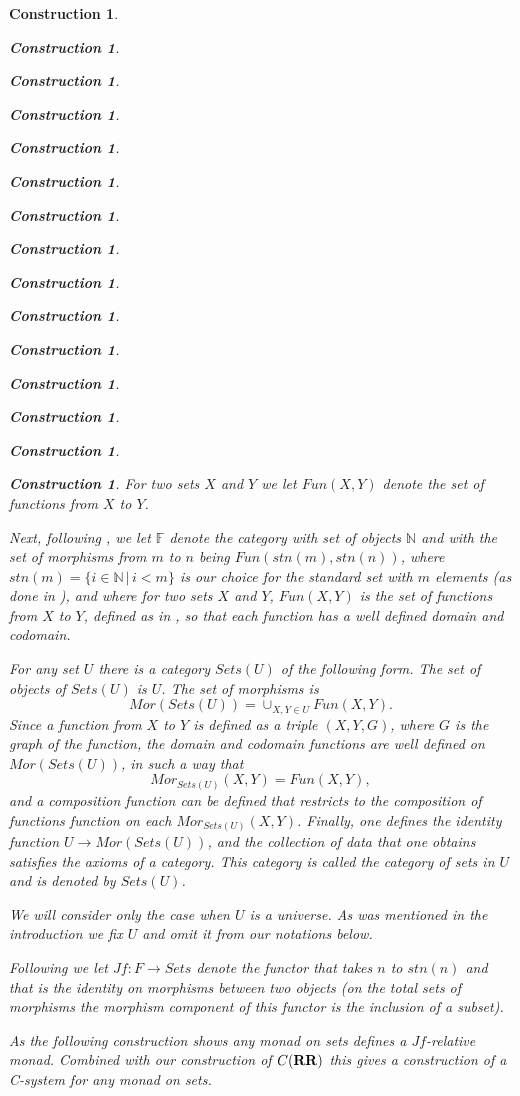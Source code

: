 \documentclass[12pt]{amsart}
\numberwithin{proposition}{subsection}
\newtheorem{construction}[proposition]{Construction}
\newcommand{\sr}{\rightarrow}
\newcommand{\nn}{{\mathbb N}}
\newcommand{\nat}{\nn}
\newcommand{\RR}{{\bf RR}}
\newcommand{\FF}{{\mathbb F}}
\begin{document}
\begin{construction}
\begin{construction}
\begin{construction}
\begin{construction}
\begin{construction}
\begin{construction}
\begin{construction}
\begin{construction}
\begin{construction}
\begin{construction}
\begin{construction}
\begin{construction}
\begin{construction}
\begin{construction}
\begin{construction}
For two sets $X$ and $Y$ we let $Fun(X,Y)$ denote the set of functions from
$X$ to $Y$.

Next, following \cite{FPT}, we let $\FF$ denote the category with set of
objects $\nat$ and with the set of morphisms from $m$ to $n$ being
$Fun(stn(m),stn(n))$, where $stn(m)=\{i\in\nat\,|\,i<m\}$ is our choice for the
standard set with $m$ elements (as done in \cite{LandC}), and where for two sets $X$
and $Y$, $Fun(X,Y)$ is the set of functions from $X$ to $Y$, defined as in
\cite[p.~81]{Bourbaki.Sets}, so that each function has a well defined domain
and codomain.

For any set $U$ there is a category $Sets(U)$ of the following form. The set of
objects of $Sets(U)$ is $U$. The set of morphisms is
%
$$Mor(Sets(U))=\cup_{X,Y\in U}Fun(X,Y).$$
%
Since a function from $X$ to $Y$ is defined as a triple $(X,Y,G)$, where $G$ is
the graph of the function, the domain and codomain functions are well
defined on $Mor(Sets(U))$, in such a way that
%
$$Mor_{Sets(U)}(X,Y)=Fun(X,Y),$$
%
and a composition function can be defined that restricts to the composition of
functions function on each $Mor_{Sets(U)}(X,Y)$. Finally, one defines the identity function
$U\sr Mor(Sets(U))$, and the collection of data that one obtains
satisfies the axioms of a category.  This category is called the {\em category of
sets in $U$} and is denoted by $Sets(U)$.

We will consider only the case when $U$ is a universe. As was mentioned in the
introduction we fix $U$ and omit it from our notations below.

Following \cite{ACU} we let $Jf:F\sr Sets$ denote the functor that takes $n$ to
$stn(n)$ and that is the identity on morphisms between two objects (on the
total sets of morphisms the morphism component of this functor is the inclusion
of a subset).

As the following construction shows any monad on sets defines a $Jf$-relative
monad. Combined with our construction of $C(\RR)$ this gives a construction of
a C-system for any monad on sets.


\end{construction}
\end{construction}
\end{construction}
\end{construction}
\end{construction}
\end{construction}
\end{construction}
\end{construction}
\end{construction}
\end{construction}
\end{construction}
\end{construction}
\end{construction}
\end{construction}
\end{construction}
\end{document}
